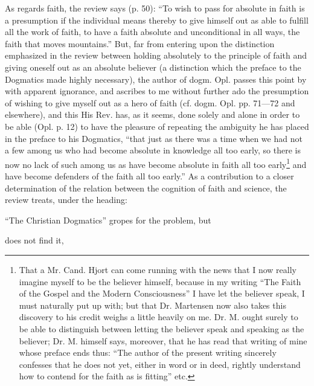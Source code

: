 \documentclass[12pt,a4paper,openany]{book}
\newcommand{\opage}[1]{\marginnote{\footnotesize\textit{[#1]}}}
\begin{document}
As regards faith, the review says (p. 50): ``To
wish to pass for absolute in faith is a presumption
if the individual means thereby to give himself out as able to fulfill
all the work of faith, to have a faith absolute and unconditional
in all ways, the faith that moves mountains.''
But, far from entering upon the distinction emphasized in the review
between holding absolutely to the principle of faith
and giving oneself out as an absolute believer (a distinction
which the preface to the Dogmatics made highly necessary),
the author of dogm. Opl. passes this point by with apparent
ignorance, and ascribes to me without further ado the presumption
of wishing to give myself out as a hero of faith (cf. dogm. Opl. pp.
71—72 and elsewhere), and this His Rev. has, as it seems,
done solely and alone in order to be able (Opl. p. 12) to have the
pleasure of repeating the ambiguity he has placed in
the preface to his Dogmatics, ``that just as there was a time when
we had not a few among us who had become absolute
in knowledge all too early, so there is now no lack of such
among us as have become absolute in faith all too early\footnote[1]{That a Mr. Cand. Hjort can come running with the news that I now really imagine myself to be the believer himself, because in my writing ``The Faith of the Gospel and the Modern Consciousness'' I have let the believer speak, I must naturally put up with; but that Dr. Martensen now also takes this discovery to his credit weighs a little heavily on me. Dr. M. ought surely to be able to distinguish between letting the believer speak and speaking as the believer; Dr. M. himself says, moreover, that he has read that writing of mine whose preface ends thus: ``The author of the present writing sincerely confesses that he does not yet, either in word or in deed, rightly understand how to contend for the faith as is fitting'' etc.} %
and have become defenders of the faith all too early.''
\setcounter{footnote}{0}%
\opage{50}As a contribution to a closer determination of the relation
between the cognition of faith and science, the review treats, under the heading:

``The Christian Dogmatics'' gropes for the problem, but

\begin{center}does not find it,\end{center}
\end{document}
